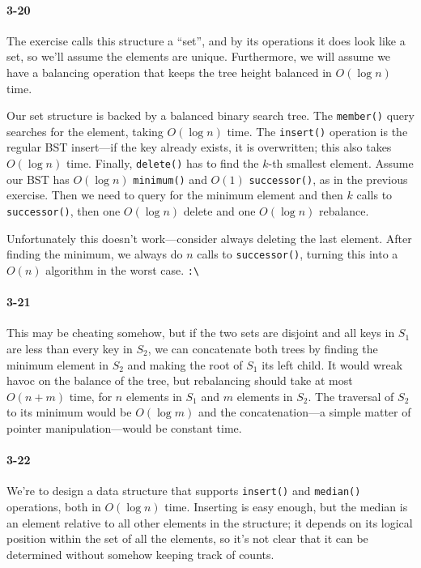 \documentclass{report}
\newcommand{\underconstruction}{\marginpar{\bcpanchant}}
\begin{document}
\paragraph{3-20} The exercise calls this structure a ``set'', and by its operations it does look like a set, so we'll assume the elements are unique. Furthermore, we will assume we have a balancing operation that keeps the tree height balanced in $O(\log n)$ time.

Our set structure is backed by a balanced binary search tree. The \lstinline!member()! query searches for the element, taking $O(\log n)$ time. The \lstinline!insert()! operation is the regular BST insert---if the key already exists, it is overwritten; this also takes $O(\log n)$ time. Finally, \lstinline!delete()! has to find the $k$-th smallest element. Assume our BST has $O(\log n)$ \lstinline!minimum()! and $O(1)$ \lstinline!successor()!, as in the previous exercise. Then we need to query for the minimum element and then $k$ calls to \lstinline!successor()!, then one $O(\log n)$ delete and one $O(\log n)$ rebalance.

Unfortunately this doesn't work---consider always deleting the last element. After finding the minimum, we always do $n$ calls to \lstinline!successor()!, turning this into a $O(n)$ algorithm in the worst case. \lstinline!:\!\underconstruction

\paragraph{3-21} This may be cheating somehow, but if the two sets are disjoint and all keys in $S_1$ are less than every key in $S_2$, we can concatenate both trees by finding the minimum element in $S_2$ and making the root of $S_1$ its left child. It would wreak havoc on the balance of the tree, but rebalancing should take at most $O(n+m)$ time, for $n$ elements in $S_1$ and $m$ elements in $S_2$. The traversal of $S_2$ to its minimum would be $O(\log m)$ and the concatenation---a simple matter of pointer manipulation---would be constant time.

\paragraph{3-22} We're to design a data structure that supports \lstinline!insert()! and \lstinline!median()! operations, both in $O(\log n)$ time. Inserting is easy enough, but the median is an element relative to all other elements in the structure; it depends on its logical position within the set of all the elements, so it's not clear that it can be determined without somehow keeping track of counts.
\end{document}
